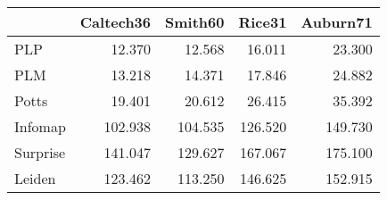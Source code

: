 \begin{tabular}{lrrrr}
\toprule
{} & Caltech36 & Smith60 &  Rice31 & Auburn71 \\
\midrule
PLP      &    12.370 &  12.568 &  16.011 &   23.300 \\
PLM      &    13.218 &  14.371 &  17.846 &   24.882 \\
Potts    &    19.401 &  20.612 &  26.415 &   35.392 \\
Infomap  &   102.938 & 104.535 & 126.520 &  149.730 \\
Surprise &   141.047 & 129.627 & 167.067 &  175.100 \\
Leiden   &   123.462 & 113.250 & 146.625 &  152.915 \\
\bottomrule
\end{tabular}
